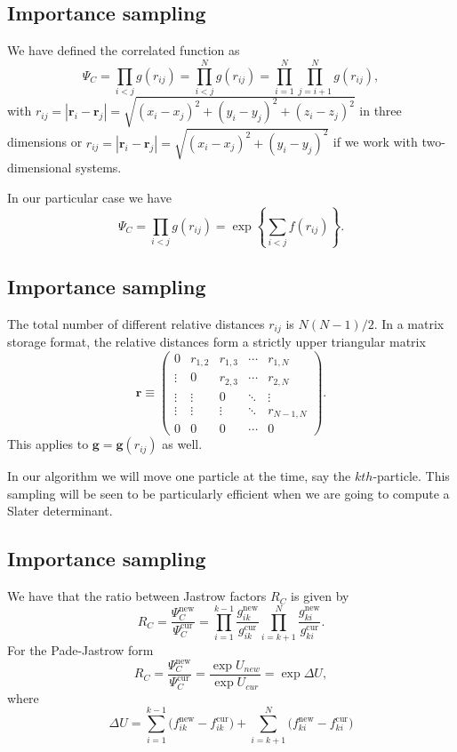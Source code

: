 \documentclass[%
oneside,                 %
final,                   %
10pt]{article}
\begin{document}
\subsection{Importance sampling}

We have defined the correlated function as
\[
\Psi_C=\prod_{i< j}g(r_{ij})=\prod_{i< j}^Ng(r_{ij})= \prod_{i=1}^N\prod_{j=i+1}^Ng(r_{ij}),
\]
with 
$r_{ij}=|\mathbf{r}_i-\mathbf{r}_j|=\sqrt{(x_i-x_j)^2+(y_i-y_j)^2+(z_i-z_j)^2}$ in three dimensions or
$r_{ij}=|\mathbf{r}_i-\mathbf{r}_j|=\sqrt{(x_i-x_j)^2+(y_i-y_j)^2}$ if we work with two-dimensional systems.

In our particular case we have
\[
\Psi_C=\prod_{i< j}g(r_{ij})=\exp{\left\{\sum_{i<j}f(r_{ij})\right\}}.
\]

\subsection{Importance sampling}

The total number of different relative distances $r_{ij}$ is $N(N-1)/2$. In a matrix storage format, the relative distances  form a strictly upper triangular matrix
\[
 \mathbf{r} \equiv \begin{pmatrix}
  0 & r_{1,2} & r_{1,3} & \cdots & r_{1,N} \\
  \vdots & 0       & r_{2,3} & \cdots & r_{2,N} \\
  \vdots & \vdots  & 0  & \ddots & \vdots  \\
  \vdots & \vdots  & \vdots  & \ddots  & r_{N-1,N} \\
  0 & 0  & 0  & \cdots  & 0
 \end{pmatrix}.
\]
This applies to  $\mathbf{g} = \mathbf{g}(r_{ij})$ as well. 

In our algorithm we will move one particle  at the time, say the $kth$-particle.  This sampling will be seen to be particularly efficient when we are going to compute a Slater determinant. 

\subsection{Importance sampling}

We have that the ratio between Jastrow factors $R_C$ is given by
\[
R_{C} = \frac{\Psi_{C}^\mathrm{new}}{\Psi_{C}^\mathrm{cur}} =
\prod_{i=1}^{k-1}\frac{g_{ik}^\mathrm{new}}{g_{ik}^\mathrm{cur}}
\prod_{i=k+1}^{N}\frac{ g_{ki}^\mathrm{new}} {g_{ki}^\mathrm{cur}}.
\]
For the Pade-Jastrow form
\[
 R_{C} = \frac{\Psi_{C}^\mathrm{new}}{\Psi_{C}^\mathrm{cur}} = 
\frac{\exp{U_{new}}}{\exp{U_{cur}}} = \exp{\Delta U},
\]
where
\[
\Delta U =
\sum_{i=1}^{k-1}\big(f_{ik}^\mathrm{new}-f_{ik}^\mathrm{cur}\big)
+
\sum_{i=k+1}^{N}\big(f_{ki}^\mathrm{new}-f_{ki}^\mathrm{cur}\big)
\]
\end{document}
